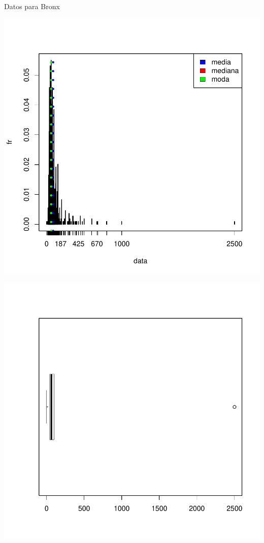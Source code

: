 \documentclass [a4paper] {article}
\begin{document}
Datos para Bronx
\begin{center}
\includegraphics{entrega-031}
\end{center}
\begin{center}
\includegraphics{entrega-032}
\end{center}
\end{document}

